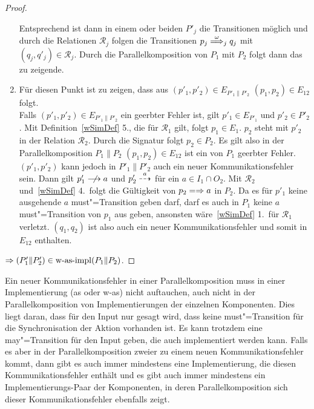 \begin{proof}
\begin{enumerate}
      Entsprechend ist dann in einem oder beiden $P'_j$ die Transitionen
      möglich und durch die Relationen $\mathcal{R}_j$ folgen die Transitionen
      $p_j \weakmust[\omega]_j q_j$ mit $(q_j,q'_j)\in\mathcal{R}_j$. Durch
      die Parallelkomposition von $P_1$ mit $P_2$ folgt dann das zu zeigende.
    \item Für diesen Punkt ist zu zeigen, dass aus $(p'_1,p'_2)\in
      E_{P'_1\|P'_2}$ $(p_1,p_2)\in E_{12}$ folgt.\\
      Falls $(p'_1,p'_2)\in E_{P'_1\|P'_2}$ ein geerbter Fehler ist, gilt
      \oBdA{} $p'_1\in E_{P'_1}$ und $p'_2\in P'_2$. Mit
      Definition~\ref{wSimDef} 5., die für $\mathcal{R}_1$ gilt, folgt $p_1\in
      E_1$. $p_2$ steht mit $p'_2$ in der Relation $\mathcal{R}_2$. Durch die
      Signatur folgt $p_2\in P_2$. Es gilt also in der Parallelkomposition
      $P_1\|P_2$ $(p_1,p_2)\in E_{12}$ ist ein von $P_1$ geerbter Fehler.
      $(p'_1,p'_2)$ kann jedoch in $P'_1\|P'_2$ auch ein neuer
      Kommunikationsfehler sein. Dann gilt \oBdA{} $p'_1\nmust{a}$ und
      $p'_2\may[a]$ für ein $a\in I_1\cap O_2$. Mit $\mathcal{R}_2$
      und~\ref{wSimDef} 4.\ folgt die Gültigkeit von $p_2\weakmay{a}$ in $P_2$.
      Da es für $p'_1$ keine ausgehende $a$ must"=Transition geben darf, darf
      es auch in $P_1$ keine $a$ must"=Transition von $p_1$ aus geben,
      ansonsten wäre~\ref{wSimDef} 1.\ für $\mathcal{R}_1$ verletzt.
      $(q_1,q_2)$ ist also auch ein neuer Kommunikationsfehler und somit in
      $E_{12}$ enthalten.
  \end{enumerate}


  $\Rightarrow (P'_1\|P'_2)\in\mathrm{w}\text{-}\mathrm{as}\text{-}\mathrm{impl} (P_1\|P_2)$.
\end{proof}

Ein neuer Kommunikationsfehler in einer Parallelkomposition muss in einer
Implementierung (as oder w-as) nicht auftauchen, auch nicht in der
Parallelkomposition von Implementierungen der einzelnen Komponenten. Dies liegt
daran, dass für den Input nur gesagt wird, dass keine must"=Transition für die
Synchronisation der Aktion vorhanden ist. Es kann trotzdem eine
may"=Transition für den Input geben, die auch implementiert werden kann.
Falls es aber in der Parallelkomposition zweier \MEIO{} zu einem neuen
Kommunikationsfehler kommt, dann gibt es auch immer mindestens eine
Implementierung, die diesen Kommunikationsfehler enthält und es gibt auch immer
mindestens ein Implementierungs-Paar der Komponenten, in deren
Parallelkomposition sich dieser Kommunikationsfehler ebenfalls zeigt.
